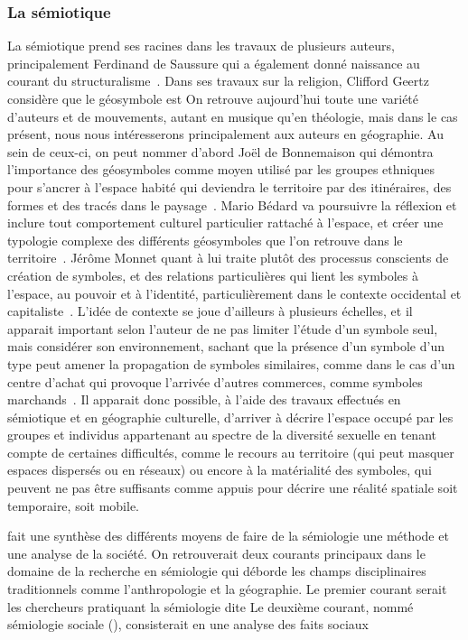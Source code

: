 \subsubsection{La sémiotique}
\label{ssub:la_semiotique}  La sémiotique prend ses racines dans les travaux de plusieurs auteurs, principalement Ferdinand de Saussure qui a également donné naissance au courant du structuralisme~\citep{Noth1995}. 
Dans ses travaux sur la religion, Clifford Geertz considère que le géosymbole est On retrouve aujourd'hui toute une variété d'auteurs et de mouvements, autant en musique qu'en théologie, mais dans le cas présent, nous nous intéresserons principalement aux auteurs en géographie. 
Au sein de ceux-ci, on peut nommer d'abord Joël de Bonnemaison qui démontra l'importance des géosymboles comme moyen utilisé par les groupes ethniques pour s'ancrer à l'espace habité qui deviendra le territoire par des itinéraires, des formes et des tracés dans le paysage~\citep{Bonnemaison1981}. 
Mario Bédard va poursuivre la réflexion et inclure tout comportement culturel particulier rattaché à l'espace, et créer une typologie complexe des différents géosymboles que l'on retrouve dans le territoire~\citep{Bedard2002}. 
Jérôme Monnet quant à lui traite plutôt des processus conscients de création de symboles, et des relations particulières qui lient les symboles à l'espace, au pouvoir et à l'identité, particulièrement dans le contexte occidental et capitaliste~\citep{Monnet1998}. 
L'idée de contexte se joue d'ailleurs à plusieurs échelles, et il apparait important selon l'auteur de ne pas limiter l'étude d'un symbole seul, mais considérer son environnement, sachant que la présence d'un symbole d'un type peut amener la propagation de symboles similaires, comme dans le cas d'un centre d'achat qui provoque l'arrivée d'autres commerces, comme symboles marchands~\citep[7-8]{Monnet1998}.
Il apparait donc possible, à l'aide des travaux effectués en sémiotique et en géographie culturelle, d'arriver à décrire l'espace occupé par les groupes et individus appartenant au spectre de la diversité sexuelle en tenant compte de certaines difficultés, comme le recours au territoire (qui peut masquer espaces dispersés ou en réseaux) ou encore à la matérialité des symboles, qui peuvent ne pas être suffisants comme appuis pour décrire une réalité spatiale soit temporaire, soit mobile.

\citet[105--109]{Rose2012} fait une synthèse des différents moyens de faire de la sémiologie une méthode et une analyse de la société. 
On retrouverait deux courants principaux dans le domaine de la recherche en sémiologie qui déborde les champs disciplinaires traditionnels comme l'anthropologie et la géographie.
Le premier courant serait les chercheurs pratiquant la sémiologie dite  
Le deuxième courant, nommé sémiologie sociale (), consisterait en une analyse des faits sociaux

